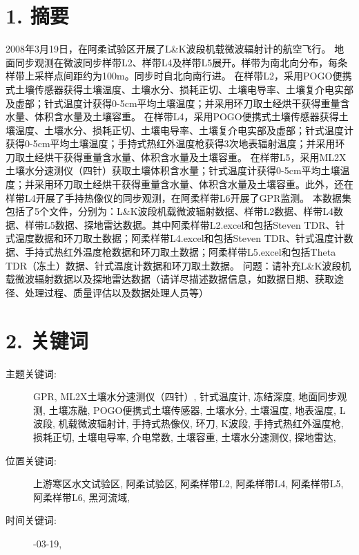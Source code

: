 \documentclass[letterpaper,10pt,english]{sphinxmanual}
\begin{document}
\section{1. 摘要}
\label{fecd46b0-3390-4580-a415-2d49ba77f9bd:id1}
2008年3月19日，在阿柔试验区开展了L\&K波段机载微波辐射计的航空飞行。 地面同步观测在微波同步样带L2、样带L4及样带L5展开。样带为南北向分布，每条样带上采样点间距约为100m。同步时自北向南行进。 在样带L2，采用POGO便携式土壤传感器获得土壤温度、土壤水分、损耗正切、土壤电导率、土壤复介电实部及虚部；针式温度计获得0-5cm平均土壤温度；并采用环刀取土经烘干获得重量含水量、体积含水量及土壤容重。 在样带L4，采用POGO便携式土壤传感器获得土壤温度、土壤水分、损耗正切、土壤电导率、土壤复介电实部及虚部；针式温度计获得0-5cm平均土壤温度；手持式热红外温度枪获得3次地表辐射温度；并采用环刀取土经烘干获得重量含水量、体积含水量及土壤容重。 在样带L5，采用ML2X土壤水分速测仪（四针）获取土壤体积含水量；针式温度计获得0-5cm平均土壤温度；并采用环刀取土经烘干获得重量含水量、体积含水量及土壤容重。此外，还在样带L4开展了手持热像仪的同步观测，在阿柔样带L6开展了GPR监测。 本数据集包括了5个文件，分别为：L\&K波段机载微波辐射数据、样带L2数据、样带L4数据、样带L5数据、探地雷达数据。其中阿柔样带L2.excel和包括Steven TDR、针式温度数据和环刀取土数据；阿柔样带L4.excel和包括Steven TDR、针式温度计数据、手持式热红外温度枪数据和环刀取土数据；阿柔样带L5.excel和包括Theta TDR（冻土）数据、针式温度计数据和环刀取土数据。 问题：请补充L\&K波段机载微波辐射数据以及探地雷达数据（请详尽描述数据信息，如数据日期、获取途径、处理过程、质量评估以及数据处理人员等）


\section{2. 关键词}
\label{fecd46b0-3390-4580-a415-2d49ba77f9bd:id2}\begin{description}
\item[{主题关键词:}] \leavevmode
GPR, ML2X土壤水分速测仪（四针）, 针式温度计, 冻结深度, 地面同步观测, 土壤冻融, POGO便携式土壤传感器, 土壤水分, 土壤温度, 地表温度, L波段, 机载微波辐射计, 手持式热像仪, 环刀, K波段, 手持式热红外温度枪, 损耗正切, 土壤电导率, 介电常数, 土壤容重, 土壤水分速测仪, 探地雷达,

\item[{位置关键词:}] \leavevmode
上游寒区水文试验区, 阿柔试验区, 阿柔样带L2, 阿柔样带L4, 阿柔样带L5, 阿柔样带L6, 黑河流域,

\item[{时间关键词:}] -03-19,

\end{description}
\end{document}
